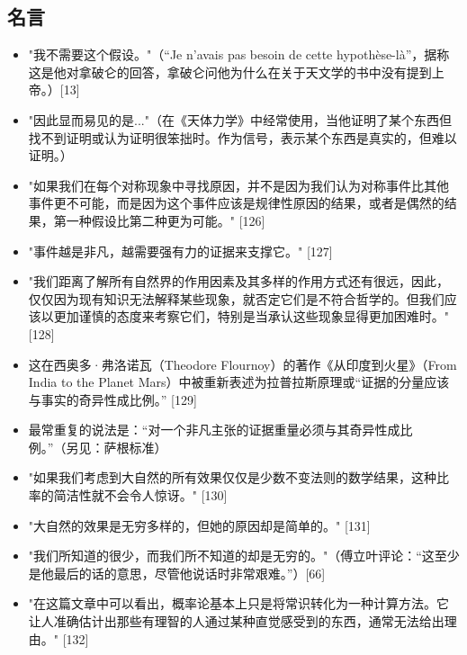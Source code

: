 \subsection{名言}  
\begin{itemize}
\item "我不需要这个假设。"（“Je n'avais pas besoin de cette hypothèse-là”，据称这是他对拿破仑的回答，拿破仑问他为什么在关于天文学的书中没有提到上帝。）[13]  
\item "因此显而易见的是..."（在《天体力学》中经常使用，当他证明了某个东西但找不到证明或认为证明很笨拙时。作为信号，表示某个东西是真实的，但难以证明。）  
\item "如果我们在每个对称现象中寻找原因，并不是因为我们认为对称事件比其他事件更不可能，而是因为这个事件应该是规律性原因的结果，或者是偶然的结果，第一种假设比第二种更为可能。" [126]  
\item "事件越是非凡，越需要强有力的证据来支撑它。" [127]  
\item "我们距离了解所有自然界的作用因素及其多样的作用方式还有很远，因此，仅仅因为现有知识无法解释某些现象，就否定它们是不符合哲学的。但我们应该以更加谨慎的态度来考察它们，特别是当承认这些现象显得更加困难时。" [128]  
\item 这在西奥多·弗洛诺瓦（Theodore Flournoy）的著作《从印度到火星》（From India to the Planet Mars）中被重新表述为拉普拉斯原理或“证据的分量应该与事实的奇异性成比例。” [129]  
\item 最常重复的说法是：“对一个非凡主张的证据重量必须与其奇异性成比例。”（另见：萨根标准）  
\item "如果我们考虑到大自然的所有效果仅仅是少数不变法则的数学结果，这种比率的简洁性就不会令人惊讶。" [130]  
\item "大自然的效果是无穷多样的，但她的原因却是简单的。" [131]  
\item "我们所知道的很少，而我们所不知道的却是无穷的。"（傅立叶评论：“这至少是他最后的话的意思，尽管他说话时非常艰难。”）[66]  
\item "在这篇文章中可以看出，概率论基本上只是将常识转化为一种计算方法。它让人准确估计出那些有理智的人通过某种直觉感受到的东西，通常无法给出理由。" [132]
\end{itemize}
